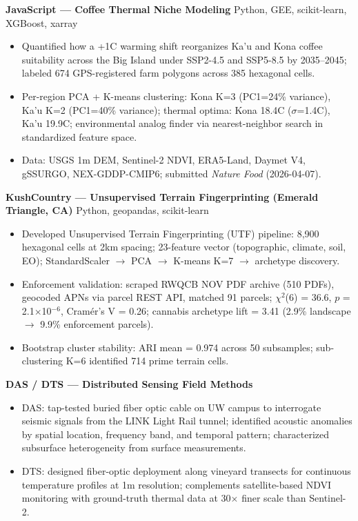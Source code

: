 \documentclass[11pt,a4paper]{article}
\begin{document}
\vspace{0.2cm}
\noindent
\textbf{JavaScript --- Coffee Thermal Niche Modeling} \hfill Python, GEE, scikit-learn, XGBoost, xarray
\begin{itemize}
    \item Quantified how a +1\textdegree C warming shift reorganizes Ka'u and Kona coffee suitability across the Big Island under SSP2-4.5 and SSP5-8.5 by 2035--2045; labeled 674 GPS-registered farm polygons across 385 hexagonal cells.
    \item Per-region PCA + K-means clustering: Kona K=3 (PC1=24\% variance), Ka'u K=2 (PC1=40\% variance); thermal optima: Kona 18.4\textdegree C ($\sigma$=1.4\textdegree C), Ka'u 19.9\textdegree C; environmental analog finder via nearest-neighbor search in standardized feature space.
    \item Data: USGS 1m DEM, Sentinel-2 NDVI, ERA5-Land, Daymet V4, gSSURGO, NEX-GDDP-CMIP6; submitted \textit{Nature Food} (2026-04-07).
\end{itemize}

\vspace{0.2cm}
\noindent
\textbf{KushCountry --- Unsupervised Terrain Fingerprinting (Emerald Triangle, CA)} \hfill Python, geopandas, scikit-learn
\begin{itemize}
    \item Developed Unsupervised Terrain Fingerprinting (UTF) pipeline: 8,900 hexagonal cells at 2km spacing; 23-feature vector (topographic, climate, soil, EO); StandardScaler $\rightarrow$ PCA $\rightarrow$ K-means K=7 $\rightarrow$ archetype discovery.
    \item Enforcement validation: scraped RWQCB NOV PDF archive (510 PDFs), geocoded APNs via parcel REST API, matched 91 parcels; $\chi^2$(6) = 36.6, $p$ = 2.1$\times$10$^{-6}$, Cram\'er's V = 0.26; cannabis archetype lift = 3.41 (2.9\% landscape $\rightarrow$ 9.9\% enforcement parcels).
    \item Bootstrap cluster stability: ARI mean = 0.974 across 50 subsamples; sub-clustering K=6 identified 714 prime terrain cells.
\end{itemize}

\vspace{0.2cm}
\noindent
\textbf{DAS / DTS --- Distributed Sensing Field Methods}
\begin{itemize}
    \item DAS: tap-tested buried fiber optic cable on UW campus to interrogate seismic signals from the LINK Light Rail tunnel; identified acoustic anomalies by spatial location, frequency band, and temporal pattern; characterized subsurface heterogeneity from surface measurements.
    \item DTS: designed fiber-optic deployment along vineyard transects for continuous temperature profiles at 1m resolution; complements satellite-based NDVI monitoring with ground-truth thermal data at 30$\times$ finer scale than Sentinel-2.
\end{itemize}
\end{document}

